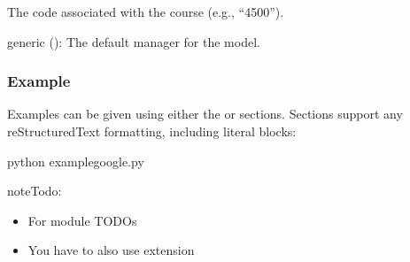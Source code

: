 \documentclass[letterpaper,10pt,english]{sphinxmanual}
\begin{document}
\begin{fulllineitems}
\begin{fulllineitems}
\end{fulllineitems}


\begin{fulllineitems}
\label{\detokenize{models/course:api.models.course.Course.course_code}}
\pysigstartsignatures
{}
\pysigstopsignatures
\sphinxAtStartPar
The code associated with the course (e.g., “4500”).
\begin{quote}\begin{description}
\sphinxAtStartPar
{}

\end{description}\end{quote}

\end{fulllineitems}

\begin{description}
\sphinxAtStartPar
generic (): The default manager for the  model.

\end{description}
\subsubsection*{Example}

\sphinxAtStartPar
Examples can be given using either the  or 
sections. Sections support any reStructuredText formatting, including
literal blocks:

\begin{sphinxVerbatim}[commandchars=\\\{\}]
\PYGZdl{} python example\PYGZus{}google.py
\end{sphinxVerbatim}

\begin{sphinxadmonition}{note}{\label{\detokenize{models/course:id1}}Todo:}\begin{itemize}
\item {} 
\sphinxAtStartPar
For module TODOs

\item {} 
\sphinxAtStartPar
You have to also use  extension


\end{itemize}
\end{sphinxadmonition}
\end{fulllineitems}
\end{document}
